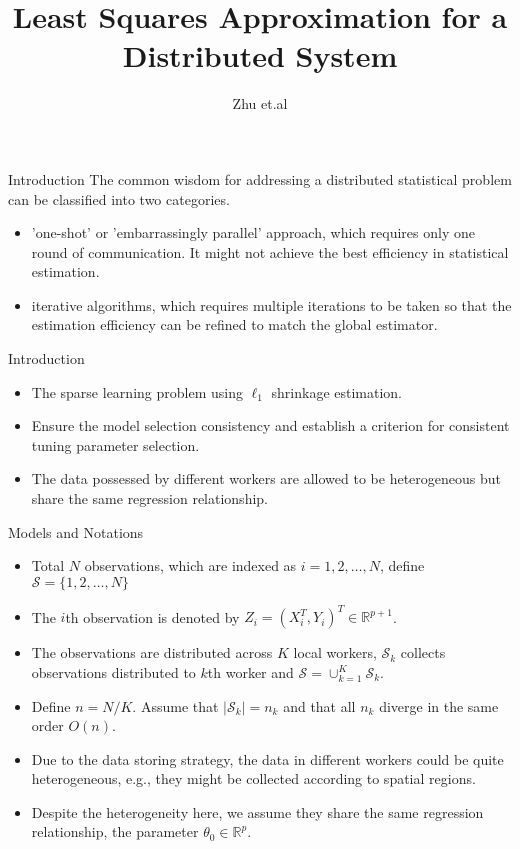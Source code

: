 \documentclass[11pt]{beamer}
\author{Zhu et.al}
\title{Least Squares Approximation for a Distributed
System}
\begin{document}
\begin{frame}
\titlepage
\end{frame}



\begin{frame}{Introduction}
The common wisdom for addressing a distributed statistical problem
can be classified into two categories.
\begin{itemize}
\item 'one-shot' or 'embarrassingly parallel' approach, which requires only one round of communication. {\color{blue} It might not achieve the best efficiency in statistical estimation.}
\item iterative algorithms, which requires multiple iterations to be taken so that the estimation efficiency can be refined to match the global estimator.
\end{itemize}


\end{frame}

\begin{frame}{Introduction}
\begin{itemize}
\item The sparse learning problem using $\ell_1$ shrinkage estimation.
\item Ensure the model selection consistency and establish a criterion for consistent tuning parameter selection.
\item The data possessed by different workers are allowed
to be heterogeneous but share the same regression relationship.
\end{itemize}
\end{frame}


\begin{frame}{Models and Notations}
\begin{itemize}
\item Total $N$ observations, which are indexed as $i=1,2,\ldots,N$, define $\mathcal{S}=\{1,2,\ldots,N\}$
\item The $i$th observation is denoted by $Z_i=(X_i^T,Y_i)^T\in \mathbb{R}^{p+1}$.
\item The observations are distributed across $K$ local workers, $\mathcal{S}_k$ collects observations distributed to $k$th worker and $\mathcal{S}=\cup_{k=1}^K \mathcal{S}_k$.
\item Define $n=N/K$. Assume that $|\mathcal{S}_k|=n_k$ and that all $n_k$ diverge in the same order $O(n)$.
\item Due to the data storing strategy,
the data in different workers could be quite heterogeneous, e.g., they might be collected
according to spatial regions.
\item Despite the heterogeneity here, we assume they share the
same regression relationship, the parameter $\theta_0\in \mathbb{R}^p$.
\end{itemize}
\end{frame}
\end{document}
